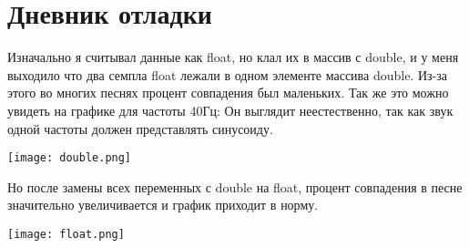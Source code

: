 \section{Дневник отладки}

Изначально я считывал данные как float, но клал их в массив с double, и у меня выходило что два семпла float лежали в одном элементе массива double. Из-за этого во многих песнях процент совпадения был маленьких. Так же это можно увидеть на графике для частоты 40Гц: Он выглядит неестественно, так как звук одной частоты должен представлять синусоиду.

\texttt{[image: double.png]}

\pagebreak

Но после замены всех переменных с double на float, процент совпадения в песне значительно увеличивается и график приходит в норму.

\texttt{[image: float.png]}  

\pagebreak
